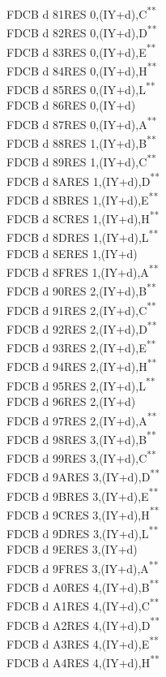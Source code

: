 \documentclass[twoside,openright,a4paper]{book}
\newcommand{\UNDOC}{\textnormal{\textsuperscript{**}}}
\begin{document}
\begin{multicols}{3}
{\begin{tabbing}
	FDCB d 81\>RES 0,(IY+d),C\UNDOC\\
	FDCB d 82\>RES 0,(IY+d),D\UNDOC\\
	FDCB d 83\>RES 0,(IY+d),E\UNDOC\\
	FDCB d 84\>RES 0,(IY+d),H\UNDOC\\
	FDCB d 85\>RES 0,(IY+d),L\UNDOC\\
	FDCB d 86\>RES 0,(IY+d)\\
	FDCB d 87\>RES 0,(IY+d),A\UNDOC\\
	FDCB d 88\>RES 1,(IY+d),B\UNDOC\\
	FDCB d 89\>RES 1,(IY+d),C\UNDOC\\
	FDCB d 8A\>RES 1,(IY+d),D\UNDOC\\
	FDCB d 8B\>RES 1,(IY+d),E\UNDOC\\
	FDCB d 8C\>RES 1,(IY+d),H\UNDOC\\
	FDCB d 8D\>RES 1,(IY+d),L\UNDOC\\
	FDCB d 8E\>RES 1,(IY+d)\\
	FDCB d 8F\>RES 1,(IY+d),A\UNDOC\\
	FDCB d 90\>RES 2,(IY+d),B\UNDOC\\
	FDCB d 91\>RES 2,(IY+d),C\UNDOC\\
	FDCB d 92\>RES 2,(IY+d),D\UNDOC\\
	FDCB d 93\>RES 2,(IY+d),E\UNDOC\\
	FDCB d 94\>RES 2,(IY+d),H\UNDOC\\
	FDCB d 95\>RES 2,(IY+d),L\UNDOC\\
	FDCB d 96\>RES 2,(IY+d)\\
	FDCB d 97\>RES 2,(IY+d),A\UNDOC\\
	FDCB d 98\>RES 3,(IY+d),B\UNDOC\\
	FDCB d 99\>RES 3,(IY+d),C\UNDOC\\
	FDCB d 9A\>RES 3,(IY+d),D\UNDOC\\
	FDCB d 9B\>RES 3,(IY+d),E\UNDOC\\
	FDCB d 9C\>RES 3,(IY+d),H\UNDOC\\
	FDCB d 9D\>RES 3,(IY+d),L\UNDOC\\
	FDCB d 9E\>RES 3,(IY+d)\\
	FDCB d 9F\>RES 3,(IY+d),A\UNDOC\\
	FDCB d A0\>RES 4,(IY+d),B\UNDOC\\
	FDCB d A1\>RES 4,(IY+d),C\UNDOC\\
	FDCB d A2\>RES 4,(IY+d),D\UNDOC\\
	FDCB d A3\>RES 4,(IY+d),E\UNDOC\\
	FDCB d A4\>RES 4,(IY+d),H\UNDOC\\

\end{tabbing}}
\end{multicols}
\end{document}
